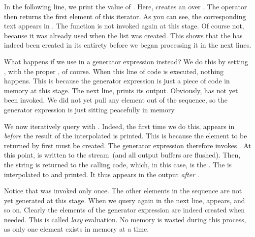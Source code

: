 In the following line, we print the value of .
Here,  creates an  over .
The  operator then returns the first element of this iterator.
As you can see, the corresponding text appears in .
The function  is not invoked again at this stage.
Of course not, because it was already used when the list was created.
This shows that the  has indeed been created in its entirety before we began processing it in the next lines.%
%
\begin{sloppypar}%
What happens if we use  in a generator expression instead?
We do this by setting , with the proper , of course.
When this line of code is executed, nothing happens.
This is because the generator expression is just a piece of code in memory at this stage.
The next line,  prints its output.
Obviously,  has not yet been invoked.
We did not yet pull any element out of the sequence, so the generator expression is just sitting peacefully in memory.%
\end{sloppypar}%
%
We now iteratively query  with .
Indeed, the first time we do this,  appears in  \emph{before} the result of the interpolated   is printed.
This is because the element to be returned by  first must be created.
The generator expression therefore invokes .
At this point,  is written to the  stream~(and all output buffers are flushed).
Then, the string  is returned to the calling code, which, in this case, is the .
The  is interpolated to  and printed.
It thus appears in the output \emph{after} .

Notice that  was invoked only once.
The other elements in the sequence are not yet generated at this stage.
When we query  again in the next line,  appears, and so on.
Clearly the elements of the generator expression are indeed created when needed.
This is called \emph{lazy} evaluation.
No memory is wasted during this process, as only one element exists in memory at a time.


